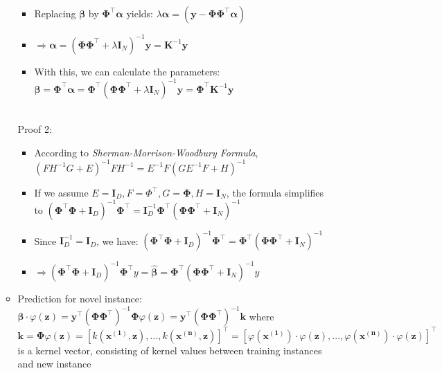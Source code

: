 \begin{itemize}
\begin{itemize}
\begin{itemize}
            \item Replacing $\boldsymbol{\beta}$ by $\boldsymbol{\Phi}^\intercal \boldsymbol{\alpha}$ yields: $\lambda \boldsymbol{\alpha} = (\boldsymbol{y} - \boldsymbol{\Phi} \boldsymbol{\Phi}^\intercal \boldsymbol{\alpha})$
            \item $\Rightarrow \boldsymbol{\alpha} = (\boldsymbol{\Phi} \boldsymbol{\Phi}^\intercal + \lambda \boldsymbol{I}_N)^{-1} \boldsymbol{y} = \boldsymbol{K}^{-1} \boldsymbol{y}$
            \item With this, we can calculate the parameters: $\boldsymbol{\beta} = \boldsymbol{\Phi}^\intercal \boldsymbol{\alpha} = \boldsymbol{\Phi}^\intercal (\boldsymbol{\Phi} \boldsymbol{\Phi}^\intercal + \lambda \boldsymbol{I}_N)^{-1} \boldsymbol{y} = \boldsymbol{\Phi}^\intercal \boldsymbol{K}^{-1} \boldsymbol{y}$
        \end{itemize}\\
        Proof 2:
        \begin{itemize}
            \item According to \emph{Sherman-Morrison-Woodbury Formula}, $(FH^{-1}G + E)^{-1}FH^{-1} = E^{-1}F(GE^{-1}F+H)^{-1}$
            \item If we assume $E = \boldsymbol{I}_D, F = \Phi^\intercal, G= \boldsymbol{\Phi},H=\boldsymbol{I}_N$, the formula simplifies to $( \boldsymbol{\Phi}^\intercal  \boldsymbol{\Phi} + \boldsymbol{I}_D)^{-1} \boldsymbol{\Phi}^\intercal = \boldsymbol{I}_D^{-1}  \boldsymbol{\Phi}^\intercal ( \boldsymbol{\Phi} \boldsymbol{\Phi}^\intercal + \boldsymbol{I}_N)^{-1}$
            \item Since $\boldsymbol{I}_D^{-1} = \boldsymbol{I}_D$, we have: $( \boldsymbol{\Phi}^\intercal  \boldsymbol{\Phi} + \boldsymbol{I}_D)^{-1} \boldsymbol{\Phi}^\intercal =  \boldsymbol{\Phi}^\intercal ( \boldsymbol{\Phi} \boldsymbol{\Phi}^\intercal + \boldsymbol{I}_N)^{-1}$
            \item $\Rightarrow ( \boldsymbol{\Phi}^\intercal  \boldsymbol{\Phi} + \boldsymbol{I}_D)^{-1} \boldsymbol{\Phi}^\intercal y = \hat{\boldsymbol{\beta}} =  \boldsymbol{\Phi}^\intercal( \boldsymbol{\Phi} \boldsymbol{\Phi}^\intercal + \boldsymbol{I}_N)^{-1}y$
        \end{itemize}
        \item Prediction for novel instance: $\boldsymbol{\beta} \cdot \varphi({\boldsymbol{z}}) = \boldsymbol{y}^\intercal (\boldsymbol{\Phi} \boldsymbol{\Phi}^\intercal)^{-1}  \boldsymbol{\Phi} \varphi({\boldsymbol{z}}) = \boldsymbol{y}^\intercal (\boldsymbol{\Phi} \boldsymbol{\Phi}^\intercal)^{-1} \boldsymbol{k}$ where $\boldsymbol{k} = \boldsymbol{\Phi} \varphi({\boldsymbol{z}}) = [ k(\boldsymbol{x^{(1)}}, \boldsymbol{z}), ..., k(\boldsymbol{x^{(n)}}, \boldsymbol{z}) ]^\intercal = [ \varphi(\boldsymbol{x^{(1)}}) \cdot \varphi(\boldsymbol{z}), ..., \varphi(\boldsymbol{x^{(n)}}) \cdot \varphi(\boldsymbol{z}) ]^\intercal$ is a kernel vector, consisting of kernel values between training instances and new instance
    \end{itemize}
\end{itemize}

